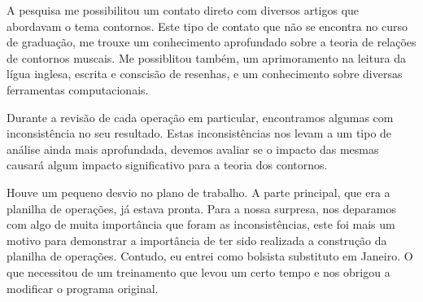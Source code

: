 \documentclass[11pt]{article}
\begin{document}
A pesquisa me possibilitou um contato direto com diversos artigos que abordavam
o tema contornos. Este tipo de contato que não se encontra no curso de graduação,
me trouxe um conhecimento aprofundado sobre a teoria de relações de contornos muscais.
Me possiblitou também, um aprimoramento na leitura da lígua inglesa, escrita e conscisão
de resenhas, e um conhecimento sobre diversas ferramentas computacionais.

Durante a revisão de cada operação em particular, encontramos algumas
com inconsistência no seu resultado. Estas inconsistências nos levam a
um tipo de análise ainda mais aprofundada, devemos avaliar se o
impacto das mesmas causará algum impacto significativo para a teoria
dos contornos.


Houve um pequeno desvio no plano de trabalho. A parte principal, que era a planilha de operações,
já estava pronta. Para a nossa surpresa, nos deparamos com algo de muita importância que foram
as inconsistências, este foi mais um motivo para demonstrar a importância de ter sido realizada a construção
da planilha de operações. Contudo, eu entrei como bolsista substituto em Janeiro. O que necessitou de um
treinamento que levou um certo tempo e nos obrigou a modificar o programa original.


\renewcommand{\refname}{Referências bibliográficas (máximo 15)}

\nocite{
  Friedmann1985,
  Friedmann1987,
  Morris1987,
  Marvin1988,
  Polansky1992,
  Morris1993,
  Clifford1995,
  Quinn1997,
  Beard2003,
  Sampaio2008,
  Schultz2008,
  Schultz2009,
  Bor2009
}





\end{document}
